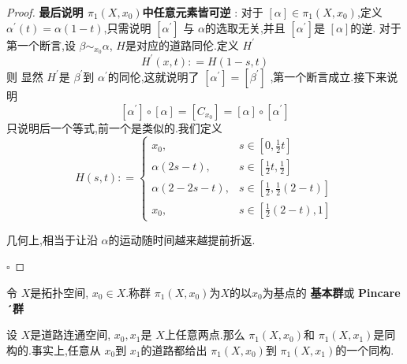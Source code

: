 \documentclass[../../几何与拓扑.tex]{subfiles}
\begin{document}
\begin{proof}
    \textbf{最后说明 \(  \pi _1 \left( X,x_0 \right)   \)中任意元素皆可逆 }: 对于 \(  [ \alpha ] \in \pi _1 \left( X,x_0 \right)   \),定义 \(   \alpha ^{\prime} \left( t \right)=   \alpha \left( 1-t \right)    \),只需说明 \(  [ \alpha ^{\prime} ]  \)  与 \(  \alpha   \)的选取无关,并且 \(  [ \alpha ^{\prime} ]  \)是 \(  [ \alpha ]  \)的逆.
        对于第一个断言,设 \(  \beta \sim _{x_0}\alpha   \), \(  H  \)是对应的道路同伦.定义 \(  H^{\prime}   \) \[
        H^{\prime} \left( x,t \right): =  H\left( 1-s ,t\right)  
        \]则 显然 \(  H^{\prime}   \)是 \(  \beta ^{\prime}   \)到 \(  \alpha ^{\prime}   \)的同伦,这就说明了 \(  [ \alpha ^{\prime} ]= [\beta ^{\prime} ]  \)       ,第一个断言成立.接下来说明 \[
        [ \alpha ^{\prime} ]\circ[ \alpha ] =  [C_{x_0}] =  [ \alpha ] \circ [ \alpha ^{\prime} ]
        \]只说明后一个等式,前一个是类似的.我们定义 \[
        H\left( s,t \right): =  \begin{cases} x_0, &  s \in [0,\frac{1}{2}t]\\ 
          \alpha \left( 2s-t \right),& s \in [\frac{1}{2}t, \frac{1}{2}]\\ 
            \alpha \left( 2-2s-t \right),&  s \in [\frac{1}{2}, \frac{1}{2}\left( 2-t \right) ]\\ 
             x_0,& s \in [\frac{1}{2}\left( 2-t \right),1 ]   \end{cases}  
        \] 
        \begin{note}
        
            几何上,相当于让沿 \(  \alpha   \)的运动随时间越来越提前折返. 
        
        \end{note}
    \hfill $\square$
\end{proof}
\begin{definition}
    令 \(  X  \)是拓扑空间, \(  x_0 \in X  \).称群 \(  \pi _1 \left( X,x_0 \right)   \)为\(  X  \)的以\(  x_0  \)为基点的  \textbf{基本群}或 \textbf{Pincare´群 }   
\end{definition}


\begin{theorem}
    设 \(  X  \)是道路连通空间, \(  x_0,x_1  \)是 \(  X  \)上任意两点.那么 \(  \pi _1 \left( X,x_0 \right)   \)和 \(  \pi _1 \left( X,x_1 \right)   \)是同构的.事实上,任意从 \(  x_0  \)到 \(  x_1  \)的道路都给出 \(  \pi _1 \left( X,x_0 \right)   \)到
    \(  \pi _1 \left( X,x_1 \right)   \)的一个同构.         
\end{theorem}
\end{document}

